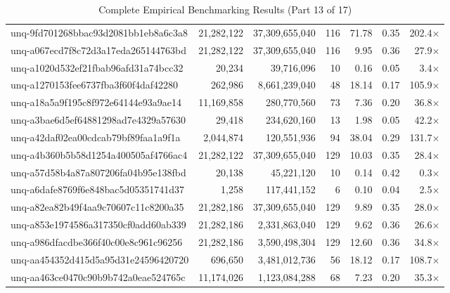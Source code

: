 \begin{table}[h!]
\begin{tabular}{lrrrrrr}
unq-9fd701268bbac93d2081bb1eb8a6c3a8 & 21,282,122 & 37,309,655,040 & 116 & 71.78 & 0.35 & 202.4$\times$ \\
unq-a067ecd7f8c72d3a17eda265144763bd & 21,282,122 & 37,309,655,040 & 116 & 9.95 & 0.36 & 27.9$\times$ \\
unq-a1020d532ef21fbab96afd31a74bcc32 & 20,234 & 39,716,096 & 10 & 0.16 & 0.05 & 3.4$\times$ \\
unq-a1270153fee6737fba3f60f4daf42280 & 262,986 & 8,661,239,040 & 48 & 18.14 & 0.17 & 105.9$\times$ \\
unq-a18a5a9f195c8f972e64144e93a9ae14 & 11,169,858 & 280,770,560 & 73 & 7.36 & 0.20 & 36.8$\times$ \\
unq-a3bae6d5ef64881298ad7e4329a57630 & 29,418 & 234,620,160 & 13 & 1.98 & 0.05 & 42.2$\times$ \\
unq-a42daf02ea00cdcab79bf89faa1a9f1a & 2,044,874 & 120,551,936 & 94 & 38.04 & 0.29 & 131.7$\times$ \\
unq-a4b360b5b58d1254a400505af4766ac4 & 21,282,122 & 37,309,655,040 & 129 & 10.03 & 0.35 & 28.4$\times$ \\
unq-a57d58b4a87a807206fa04b95e138fbd & 20,138 & 45,221,120 & 10 & 0.14 & 0.42 & 0.3$\times$ \\
unq-a6dafe8769f6e848bac5d05351741d37 & 1,258 & 117,441,152 & 6 & 0.10 & 0.04 & 2.5$\times$ \\
unq-a82ea82b49f4aa9c70607c11c8200a35 & 21,282,186 & 37,309,655,040 & 129 & 9.89 & 0.35 & 28.0$\times$ \\
unq-a853e1974586a317350cf0add60ab339 & 21,282,186 & 2,331,863,040 & 129 & 9.62 & 0.36 & 26.6$\times$ \\
unq-a986dfacdbe366f40c00e8c961c96256 & 21,282,186 & 3,590,498,304 & 129 & 12.60 & 0.36 & 34.8$\times$ \\
unq-aa454352d415d5a95d31e24596420720 & 696,650 & 3,481,012,736 & 56 & 18.12 & 0.17 & 108.7$\times$ \\
unq-aa463ce0470c90b9b742a0eae524765c & 11,174,026 & 1,123,084,288 & 68 & 7.23 & 0.20 & 35.3$\times$ \\
\bottomrule
\end{tabular}
\caption{Complete Empirical Benchmarking Results (Part 13 of 17)}
\end{table}

\clearpage

